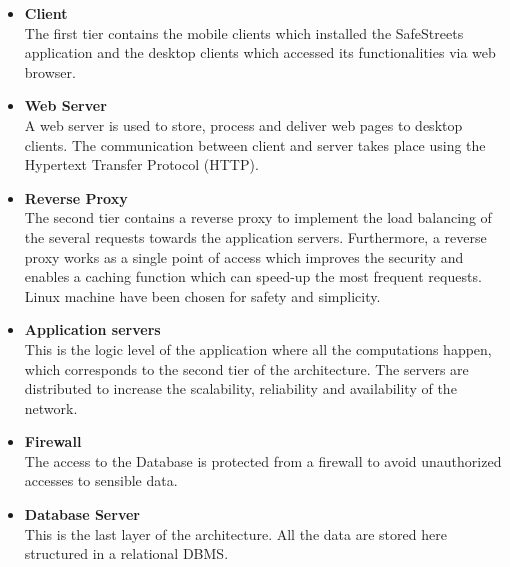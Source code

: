 \documentclass{report}
\begin{document}
\begin{itemize}
    \item \textbf{Client}\\
    The first tier contains the mobile clients which installed the SafeStreets application and the desktop clients which accessed its functionalities via web browser.\\
    \item \textbf{Web Server}\\
    A web server is used to store, process and deliver web pages to desktop
    clients. The communication between client and server takes place using the
    Hypertext Transfer Protocol (HTTP).
    \item \textbf{Reverse Proxy}\\
    The second tier contains a reverse proxy to implement the load balancing of the several requests towards the application servers.
    Furthermore, a reverse proxy works as a single point of access which improves the security and enables a caching function which can speed-up the most frequent requests.
    Linux machine have been chosen for safety and simplicity. \\
    \item \textbf{Application servers}\\
    This is the logic level of the application where all the computations happen, which corresponds to the second tier of the architecture. The servers
    are distributed to increase the scalability, reliability and availability of the network.\\
    \item \textbf{Firewall}\\
    The access to the Database is protected from a firewall to avoid unauthorized accesses to sensible data.\\
    \item \textbf{Database Server}\\
    This is the last layer of the architecture. All the data are stored here structured in a relational DBMS.
\end{itemize}
\newpage
\end{document}
